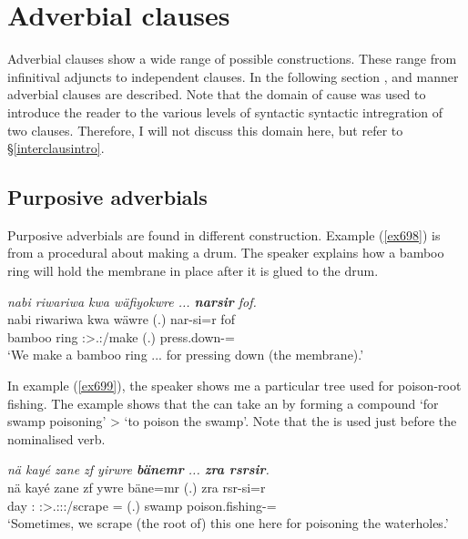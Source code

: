 \section{Adverbial clauses}\label{advclauses}

Adverbial clauses show a wide range of possible constructions. These range from infinitival adjuncts to independent clauses. In the following section ,  and manner adverbial clauses are described. Note that the domain of cause was used to introduce the reader to the various levels of syntactic syntactic intregration of two clauses. Therefore, I will not discuss this domain here, but refer to \S{}\ref{interclausintro}.

\subsection{Purposive adverbials}\label{purposeadverbials}

Purposive adverbials are found in different construction. Example (\ref{ex698})	is from a procedural about making a drum. The speaker explains how a bamboo ring will hold the membrane in place after it is glued to the drum.

\begin{exe}
	\ex \emph{nabi riwariwa kwa wäfiyokwre ... \textbf{narsir} fof.}\\
	\gll nabi riwariwa kwa wäwre (.) nar-si=r fof\\
	bamboo ring \Fut{} \Fpl:\Sbj>\Tsg.\Nonpast:\Ipfv/make (.) press.down-\Nmlz=\Purp{} \Emph\\
	\trans `We make a bamboo ring ... for pressing down (the membrane).'
	\label{ex698}
\end{exe}

In example (\ref{ex699}), the speaker shows me a particular tree used for poison-root fishing. The example shows that the   can take an  by forming a compound `for swamp poisoning' > `to poison the swamp'. Note that the   is used just before the nominalised verb.

\begin{exe}
	\ex \emph{nä kayé zane zf yirwre \textbf{bänemr} ... \textbf{zra rsrsir}.}\\
	\gll nä kayé zane zf ywre bäne=mr (.) zra rsr-si=r\\
	\Indf{} day \Dem:\Prox{} \Imm{} \Fpl:\Sbj>\Tsg.\Masc:\Obj:\Nonpast:\Ipfv/scrape \Recog=\Purp{} (.) swamp poison.fishing-\Nmlz=\Purp\\
	\trans `Sometimes, we scrape (the root of) this one here for poisoning the waterholes.'
	\label{ex699}
\end{exe}

